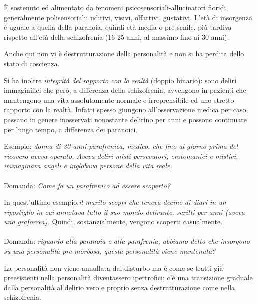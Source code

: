 È sostenuto ed alimentato da fenomeni psicosensoriali-allucinatori
floridi, generalmente polisensoriali: uditivi, visivi, olfattivi,
gustativi. L'età di insorgenza è uguale a quella della paranoia, quindi
età media o pre-senile, più tardiva rispetto all'età della schizofrenia
(16-25 anni, al massimo fino ai 30 anni).

Anche qui non vi è destrutturazione della personalità e non si ha
perdita dello stato di coscienza.

Si ha inoltre \emph{integrità del rapporto con la realtà} (doppio
binario): sono deliri immaginifici che però, a differenza della
schizofrenia, avvengono in pazienti che mantengono una vita
assolutamente normale e irreprensibile ed uno stretto rapporto con la
realtà. Infatti spesso giungono all'osservazione medica per caso,
passano in genere inosservati nonostante delirino per anni e possono
continuare per lungo tempo, a differenza dei paranoici.

Esempio: \emph{donna di 30 anni parafrenica, medico, che fino al giorno
prima del ricovero aveva operato. Aveva deliri misti persecutori,
erotomanici e mistici, immaginava angeli e inglobava persone della vita
reale. }
\\\\
Domanda: \emph{Come fa un parafrenico ad essere scoperto?}

In quest'ultimo esempio,\emph{il marito scoprì che teneva decine di
diari in un ripostiglio in cui annotava tutto il suo mondo delirante,
scritti per anni (aveva una graforrea).} Quindi, sostanzialmente,
vengono scoperti casualmente.
\\\\
Domanda: \emph{riguardo alla paranoia e alla parafrenia, abbiamo detto
che insorgono su una personalità pre-morbosa, questa personalità viene
mantenuta?}

La personalità non viene annullata dal disturbo ma è come se tratti già
preesistenti nella personalità diventassero ipertrofici; c'è una
transizione graduale dalla personalità al delirio vero e proprio senza
destrutturazione come nella schizofrenia.
